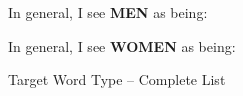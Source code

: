\documentclass[serif, twocolumn, numeric, empirical]{jote-article}
\begin{document}
In general, I see \textbf{MEN} as being:










In general, I see \textbf{WOMEN} as being:








\begin{Center}
Target Word Type – Complete List
\end{Center}

\end{document}
